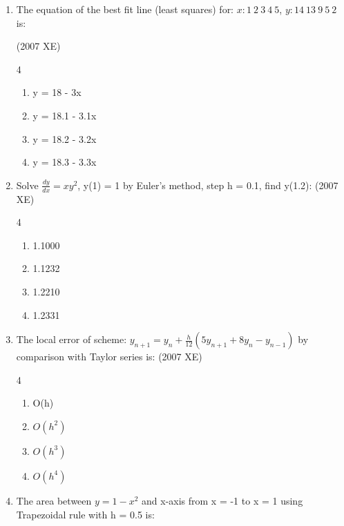 \begin{enumerate}[label=\thesubsection.\arabic*,ref=\thesubsection.\theenumi]
    \item The equation of the best fit line (least squares) for: $x: 1\ 2\ 3\ 4\ 5$, $y: 14\ 13\ 9\ 5\ 2 $ is:

    \hfill{(2007 XE)}
    \begin{multicols}{4}
    \begin{enumerate}
        \item y = 18 - 3x
        \item y = 18.1 - 3.1x
        \item y = 18.2 - 3.2x
        \item y = 18.3 - 3.3x
    \end{enumerate}
\end{multicols}

    \item Solve $\frac{dy}{dx} = xy^2$, y(1) = 1 by Euler's method, step h = 0.1, find y(1.2):
    \hfill{(2007 XE)}
    \begin{multicols}{4}
    \begin{enumerate}
        \item 1.1000
        \item 1.1232
        \item 1.2210
        \item 1.2331
    \end{enumerate}
\end{multicols}

    \item The local error of scheme: $y_{n+1} = y_n + \frac{h}{12} (5y_{n+1} + 8y_n - y_{n-1})$ by comparison with Taylor series is:
    \hfill{(2007 XE)}
    \begin{multicols}{4}
    \begin{enumerate}
        \item O(h)
        \item $O(h^2)$
        \item $O(h^3)$ 
        \item $O(h^4)$
    \end{enumerate}
\end{multicols}

    \item The area between $y = 1 - x^2$ and x-axis from x = -1 to x = 1 using Trapezoidal rule with h = 0.5 is:


\end{enumerate}
